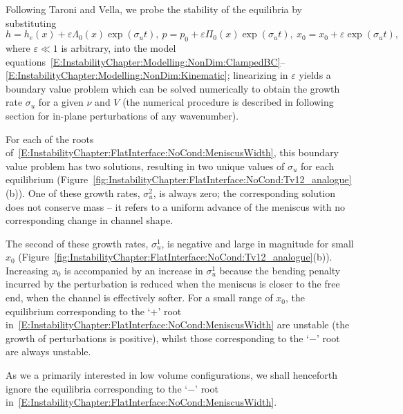 Following Taroni and Vella, we probe the stability of the equilibria by substituting
\begin{equation}\label{E:InstabilityChapter:FlatInterface:NoCond:uniform_perturbation}
h = h_e(x) + \varepsilon \Lambda_0(x)\exp(\sigma_u t),~p = p_0 + \varepsilon \Pi_0(x)\exp(\sigma_u t),~ x_0 = x_0 +  \varepsilon \exp(\sigma_u t),
\end{equation}
where $\varepsilon \ll 1$ is arbitrary, into the model equations~\eqref{E:InstabilityChapter:Modelling:NonDim:ClampedBC}--\eqref{E:InstabilityChapter:Modelling:NonDim:Kinematic}; linearizing in $\varepsilon$ yields a boundary value problem which can be solved numerically to obtain the growth rate $\sigma_u$ for a given $\nu$ and $V$ (the numerical procedure is described in following section for in-plane perturbations of any wavenumber).

For each of the roots of~\eqref{E:InstabilityChapter:FlatInterface:NoCond:MeniscusWidth}, this boundary value problem has two solutions, resulting in two unique values of $\sigma_u$ for each equilibrium (Figure~\ref{fig:InstabilityChapter:FlatInterface:NoCond:Tv12_analogue}(b)). One of these growth rates, $\sigma_u^2$, is always zero; the corresponding solution does not conserve mass -- it refers to a uniform advance of the meniscus with no corresponding change in channel shape.

The second of these growth rates, $\sigma_u^1$, is negative and large in magnitude for small $x_0$ (Figure~\ref{fig:InstabilityChapter:FlatInterface:NoCond:Tv12_analogue}(b)). Increasing $x_0$ is accompanied by an increase in $\sigma_u^1$ because  the bending penalty incurred by the perturbation is reduced when the meniscus is closer to the free end, when the channel is effectively softer. For a small range of $x_0$, the equilibrium corresponding to the `$+$' root in~\eqref{E:InstabilityChapter:FlatInterface:NoCond:MeniscusWidth} are unstable (the growth of perturbations is positive), whilst those corresponding to the `$-$' root are always unstable.

As we a primarily interested in low volume configurations, we shall henceforth ignore the equilibria corresponding to the `$-$' root in~\eqref{E:InstabilityChapter:FlatInterface:NoCond:MeniscusWidth}.


